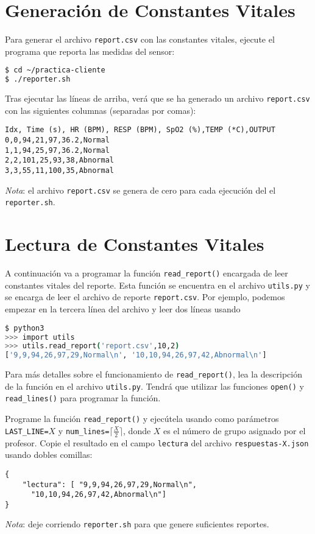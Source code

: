 \documentclass{upmassignment}
\begin{document}
\section*{Generación de Constantes Vitales}
\noindent Para generar el archivo
\texttt{report.csv} con las constantes
vitales, ejecute el programa
que reporta las medidas del sensor:
\begin{lstlisting}[language=bash]
$ cd ~/practica-cliente
$ ./reporter.sh
\end{lstlisting}
Tras ejecutar las líneas de arriba,
verá que se ha generado un archivo
\texttt{report.csv} con las siguientes
columnas (separadas por comas):
\begin{lstlisting}
Idx, Time (s), HR (BPM), RESP (BPM), SpO2 (%),TEMP (*C),OUTPUT
0,0,94,21,97,36.2,Normal
1,1,94,25,97,36.2,Normal
2,2,101,25,93,38,Abnormal
3,3,55,11,100,35,Abnormal
\end{lstlisting}
\emph{Nota}:
el archivo \texttt{report.csv} se genera
de cero para cada ejecución del
el \texttt{reporter.sh}. 


\section*{Lectura de Constantes Vitales}
\noindent 
A continuación va a programar la
función \texttt{read\_report()} encargada
de leer constantes vitales del reporte.
Esta función se encuentra en el archivo
\texttt{utils.py} y se encarga
de leer el archivo de reporte
\texttt{report.csv}. Por ejemplo,
podemos empezar en la tercera línea
del archivo y leer dos líneas usando
\begin{lstlisting}[language=bash]
$ python3
>>> import utils
>>> utils.read_report('report.csv',10,2)
['9,9,94,26,97,29,Normal\n', '10,10,94,26,97,42,Abnormal\n']
\end{lstlisting}

Para más detalles sobre el funcionamiento
de \texttt{read\_report()}, lea
la descripción de la función en el
archivo \texttt{utils.py}.
Tendrá que utilizar las funciones
\texttt{open()} y \texttt{read\_lines()}
para programar la función.


\begin{problemlist}
    \pbitem Programe la función
    \texttt{read\_report()} y
    ejecútela usando como parámetros
    \texttt{LAST\_LINE=$X$}
    y
    \texttt{num\_lines=$\lceil \tfrac{X}{2} \rceil$},
    donde $X$ es el número de grupo
    asignado por el profesor.
    Copie el resultado en el
    campo \texttt{lectura} del
    archivo
    \texttt{respuestas-X.json}
    usando dobles comillas:
\begin{lstlisting}
{
    "lectura": [ "9,9,94,26,97,29,Normal\n",
      "10,10,94,26,97,42,Abnormal\n"]
}
\end{lstlisting}
\end{problemlist}
\emph{Nota}: deje corriendo
\texttt{reporter.sh} para que genere
suficientes reportes.
\end{document}
